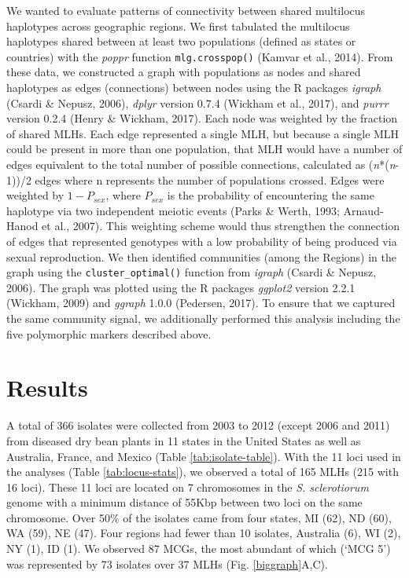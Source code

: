 We wanted to evaluate patterns of connectivity between shared multilocus
haplotypes across geographic regions. We first tabulated the multilocus
haplotypes shared between at least two populations (defined as states or
countries) with the \emph{poppr} function \texttt{mlg.crosspop()}
(Kamvar et al., 2014). From these data, we constructed a graph with
populations as nodes and shared haplotypes as edges (connections)
between nodes using the R packages \emph{igraph} (Csardi \& Nepusz,
2006), \emph{dplyr} version 0.7.4 (Wickham et al., 2017), and
\emph{purrr} version 0.2.4 (Henry \& Wickham, 2017). Each node was
weighted by the fraction of shared MLHs. Each edge represented a single
MLH, but because a single MLH could be present in more than one
population, that MLH would have a number of edges equivalent to the
total number of possible connections, calculated as
(\emph{n}*(\emph{n}-1))/2 edges where n represents the number of
populations crossed. Edges were weighted by \(1-P_{sex}\), where
\(P_{sex}\) is the probability of encountering the same haplotype via
two independent meiotic events (Parks \& Werth, 1993; Arnaud-Hanod et
al., 2007). This weighting scheme would thus strengthen the connection
of edges that represented genotypes with a low probability of being
produced via sexual reproduction. We then identified communities (among
the Regions) in the graph using the \texttt{cluster\_optimal()} function
from \emph{igraph} (Csardi \& Nepusz, 2006). The graph was plotted using
the R packages \emph{ggplot2} version 2.2.1 (Wickham, 2009) and
\emph{ggraph} 1.0.0 (Pedersen, 2017). To ensure that we captured the
same community signal, we additionally performed this analysis including
the five polymorphic markers described above.

\section*{Results}\label{results}

A total of 366 isolates were collected from 2003 to 2012 (except 2006
and 2011) from diseased dry bean plants in 11 states in the United
States as well as Australia, France, and Mexico (Table
\ref{tab:isolate-table}). With the 11 loci used in the analyses (Table
\ref{tab:locus-stats}), we observed a total of 165 MLHs (215 with 16
loci). These 11 loci are located on 7 chromosomes in the \emph{S.
sclerotiorum} genome with a minimum distance of 55Kbp between two loci
on the same chromosome. Over 50\% of the isolates came from four states,
MI (62), ND (60), WA (59), NE (47). Four regions had fewer than 10
isolates, Australia (6), WI (2), NY (1), ID (1). We observed 87 MCGs,
the most abundant of which (`MCG 5') was represented by 73 isolates over
37 MLHs (Fig. \ref{biggraph}A,C).

